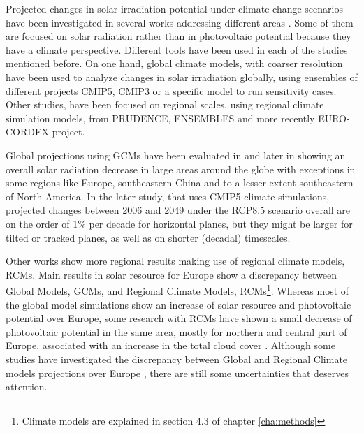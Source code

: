 


Projected changes in solar irradiation potential under climate change scenarios have been investigated in several works addressing different areas \cite*{Bartok2010, Crook2011, Gaetani2014, Wild2015,Jerez2015}. Some of them are focused on solar radiation rather than in photovoltaic potential because they have a climate perspective. Different tools have been used in each of the studies mentioned before. On one hand, global climate models, with coarser resolution have been used to analyze changes in solar irradiation globally, using ensembles of different projects CMIP5, CMIP3 or a specific model to run sensitivity cases. Other studies, have been focused on regional scales, using regional climate simulation models, from PRUDENCE, ENSEMBLES and more recently EURO-CORDEX project.

Global projections using GCMs have been evaluated in \cite*{Crook2011} and later in \cite*{Wild2012} showing an overall solar radiation decrease in large areas around the globe with exceptions in some regions like Europe, southeastern China and to a lesser extent southeastern of North-America. In the later study, that uses CMIP5 climate simulations, projected changes between 2006 and 2049 under the RCP8.5 scenario overall are on the order of 1$\%$ per decade for horizontal planes, but they might be larger for tilted or tracked planes, as well as on shorter (decadal) timescales.  

Other works show more regional results making use of regional climate models, RCMs. Main results in solar resource for Europe show a discrepancy between Global Models, GCMs, and Regional Climate Models, RCMs\footnote{Climate models are explained in section 4.3 of chapter \ref{cha:methods}}. Whereas most of the global model simulations show an increase of solar resource and photovoltaic potential over Europe, some research with RCMs have shown a small decrease of photovoltaic potential in the same area, mostly for northern and central part of Europe, associated with an increase in the total cloud cover \cite*{Jerez2015}. Although some studies have investigated the discrepancy between Global and Regional Climate models projections over Europe \cite*{Bartok2017}, there are still some uncertainties that deserves attention.

